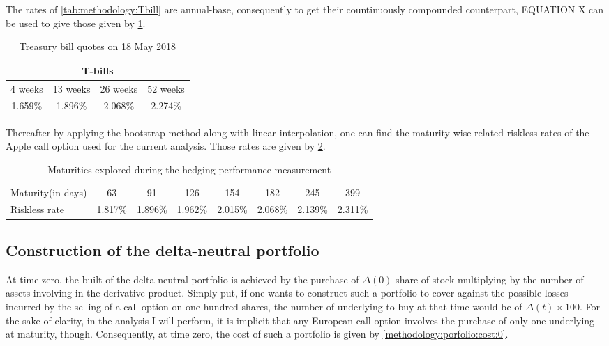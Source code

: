\documentclass[12pt]{report}
\begin{document}
The rates of \cref{tab:methodology:Tbill} are annual-base, consequently to get their countinuously compounded counterpart, EQUATION X can be used to give those given by \cref{tab:methodology:Tbill:compound}.


\begin{table}[ht]
\centering
\begin{tabular}{cccc}
  \hline
  \multicolumn{4}{c}{T-bills} \\
  \hline
  4 weeks & 13 weeks & 26 weeks & 52 weeks \\
  1.659\% & 1.896\% & 2.068\% & 2.274\% \\
  \hline
\end{tabular}
\caption{Treasury bill quotes on 18 May 2018} 
\label{tab:methodology:Tbill:compound}
\end{table}

Thereafter by applying the bootstrap method along with linear interpolation, one can find the maturity-wise related riskless rates of the Apple call option used for the current analysis. Those rates are given by \cref{tab:methodology:tbill:maturity}.

\begin{table}[ht]
\centering
\begin{tabular}{l|ccccccc}

  \hline
Maturity(in days) & 63   & 91   & 126  & 154    & 182  & 245    & 399 \\ 
Riskless rate     &  1.817\% & 1.896\% & 1.962\% & 2.015\%  & 2.068\%  & 2.139\%   & 2.311\% \\
   \hline
\end{tabular}
\caption{Maturities explored during the hedging performance measurement} 
\label{tab:methodology:tbill:maturity}
\end{table}




\subsection{Construction of the delta-neutral portfolio}
\label{sec:methodology:construction}

At time zero, the built of the delta-neutral portfolio is achieved by the purchase of $\Delta(0)$ share of stock multiplying by the number of assets involving in the derivative product.
Simply put, if one wants to construct such a portfolio to cover against the possible losses incurred by the selling of a call option on one hundred shares, the number of underlying to buy at that time would be of $\Delta(t) \times 100$.
For the sake of clarity, in the analysis I will perform, it is implicit that any European call option involves the purchase of only one underlying at maturity, though.
Consequently, at time zero, the cost of such a portfolio is given by \cref{methodology:porfolio:cost:0}.
\end{document}
